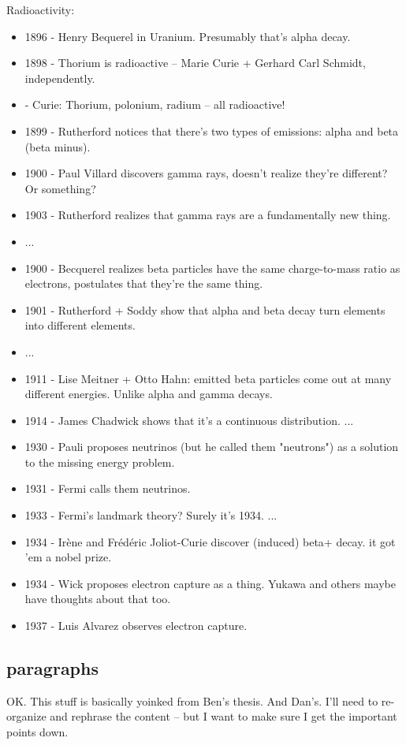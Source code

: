 Radioactivity:
\begin{itemize}
\item 1896 - Henry Bequerel in Uranium.  Presumably that's alpha decay.
\item 1898 - Thorium is radioactive -- Marie Curie + Gerhard Carl Schmidt, independently.
\item 	 - Curie:  Thorium, polonium, radium -- all radioactive!
\item 1899 - Rutherford notices that there's two types of emissions:  alpha and beta (beta minus).
\item 1900 - Paul Villard discovers gamma rays, doesn't realize they're different?  Or something?
\item 1903 - Rutherford realizes that gamma rays are a fundamentally new thing.
\item ...
\item 1900 - Becquerel realizes beta particles have the same charge-to-mass ratio as electrons, postulates that they're the same thing.
\item 1901 - Rutherford + Soddy show that alpha and beta decay turn elements into different elements.  
\item ...
\item 1911 - Lise Meitner + Otto Hahn:  emitted beta particles come out at many different energies.  Unlike alpha and gamma decays.
\item 1914 - James Chadwick shows that it's a continuous distribution.
...
\item 1930 - Pauli proposes neutrinos (but he called them "neutrons") as a solution to the missing energy problem.
\item 1931 - Fermi calls them neutrinos.  
\item 1933 - Fermi's landmark theory?  Surely it's 1934.
...
\item 1934 - Irène and Frédéric Joliot-Curie discover (induced) beta+ decay.  it got 'em a nobel prize.
\item 1934 - Wick proposes electron capture as a thing.  Yukawa and others maybe have thoughts about that too.
\item 1937 - Luis Alvarez observes electron capture.
\end{itemize}

\subsection{paragraphs}
OK.  This stuff is basically yoinked from Ben's thesis.  And Dan's.  I'll need to re-organize and rephrase the content -- but I want to make sure I get the important points down.  

